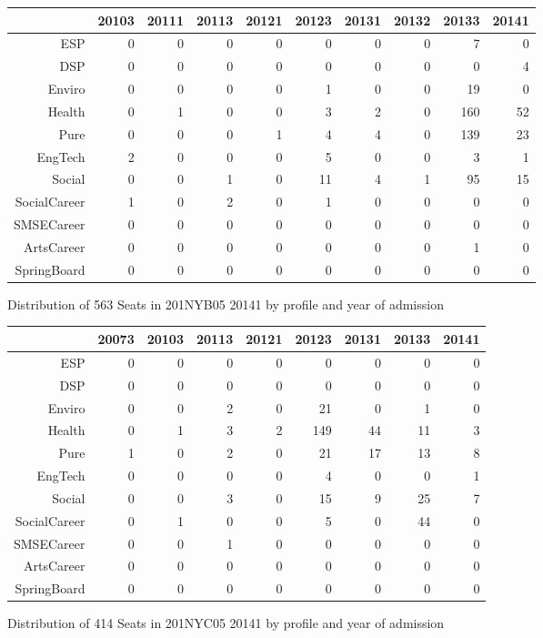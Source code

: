 \documentclass{article}\usepackage[]{graphicx}\usepackage[]{color}
\begin{document}
\begin{figure}[H]
\centering
\begin{tabular}{rrrrrrrrrr}
  \hline
 & 20103 & 20111 & 20113 & 20121 & 20123 & 20131 & 20132 & 20133 & 20141 \\ 
  \hline
ESP &   0 &   0 &   0 &   0 &   0 &   0 &   0 &   7 &   0 \\ 
  DSP &   0 &   0 &   0 &   0 &   0 &   0 &   0 &   0 &   4 \\ 
  Enviro &   0 &   0 &   0 &   0 &   1 &   0 &   0 &  19 &   0 \\ 
  Health &   0 &   1 &   0 &   0 &   3 &   2 &   0 & 160 &  52 \\ 
  Pure &   0 &   0 &   0 &   1 &   4 &   4 &   0 & 139 &  23 \\ 
  EngTech &   2 &   0 &   0 &   0 &   5 &   0 &   0 &   3 &   1 \\ 
  Social &   0 &   0 &   1 &   0 &  11 &   4 &   1 &  95 &  15 \\ 
  SocialCareer &   1 &   0 &   2 &   0 &   1 &   0 &   0 &   0 &   0 \\ 
  SMSECareer &   0 &   0 &   0 &   0 &   0 &   0 &   0 &   0 &   0 \\ 
  ArtsCareer &   0 &   0 &   0 &   0 &   0 &   0 &   0 &   1 &   0 \\ 
  SpringBoard &   0 &   0 &   0 &   0 &   0 &   0 &   0 &   0 &   0 \\ 
   \hline
\end{tabular}
\caption{Distribution of 563 Seats in 201NYB05 20141 by profile and year of admission} 
\end{figure}
\begin{figure}[H]
\centering
\begin{tabular}{rrrrrrrrr}
  \hline
 & 20073 & 20103 & 20113 & 20121 & 20123 & 20131 & 20133 & 20141 \\ 
  \hline
ESP &   0 &   0 &   0 &   0 &   0 &   0 &   0 &   0 \\ 
  DSP &   0 &   0 &   0 &   0 &   0 &   0 &   0 &   0 \\ 
  Enviro &   0 &   0 &   2 &   0 &  21 &   0 &   1 &   0 \\ 
  Health &   0 &   1 &   3 &   2 & 149 &  44 &  11 &   3 \\ 
  Pure &   1 &   0 &   2 &   0 &  21 &  17 &  13 &   8 \\ 
  EngTech &   0 &   0 &   0 &   0 &   4 &   0 &   0 &   1 \\ 
  Social &   0 &   0 &   3 &   0 &  15 &   9 &  25 &   7 \\ 
  SocialCareer &   0 &   1 &   0 &   0 &   5 &   0 &  44 &   0 \\ 
  SMSECareer &   0 &   0 &   1 &   0 &   0 &   0 &   0 &   0 \\ 
  ArtsCareer &   0 &   0 &   0 &   0 &   0 &   0 &   0 &   0 \\ 
  SpringBoard &   0 &   0 &   0 &   0 &   0 &   0 &   0 &   0 \\ 
   \hline
\end{tabular}
\caption{Distribution of 414 Seats in 201NYC05 20141 by profile and year of admission} 
\end{figure}
\end{document}
